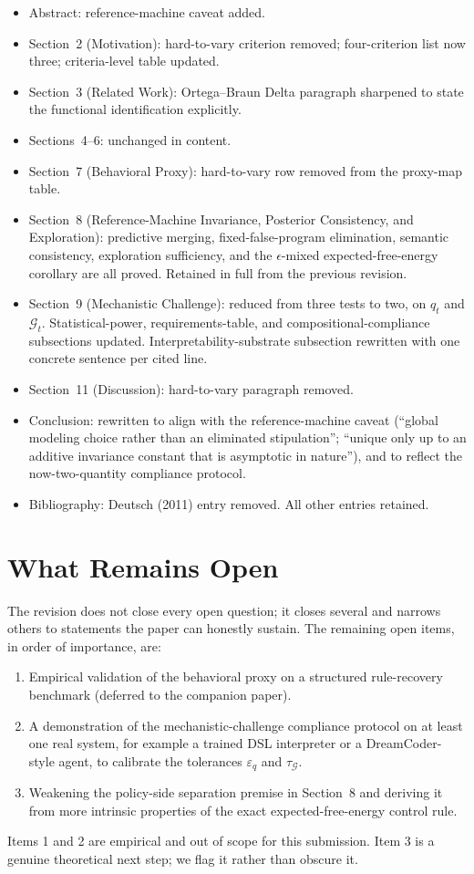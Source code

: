 \documentclass[11pt]{article}
\begin{document}
\begin{itemize}
\item Abstract: reference-machine caveat added.
\item Section~2 (Motivation): hard-to-vary criterion removed; four-criterion list now three; criteria-level table updated.
\item Section~3 (Related Work): Ortega--Braun Delta paragraph sharpened to state the functional identification explicitly.
\item Sections~4--6: unchanged in content.
\item Section~7 (Behavioral Proxy): hard-to-vary row removed from the proxy-map table.
\item Section~8 (Reference-Machine Invariance, Posterior Consistency, and Exploration): predictive merging, fixed-false-program elimination, semantic consistency, exploration sufficiency, and the $\epsilon$-mixed expected-free-energy corollary are all proved. Retained in full from the previous revision.
\item Section~9 (Mechanistic Challenge): reduced from three tests to two, on $q_t$ and $\mathcal{G}_t$. Statistical-power, requirements-table, and compositional-compliance subsections updated. Interpretability-substrate subsection rewritten with one concrete sentence per cited line.
\item Section~11 (Discussion): hard-to-vary paragraph removed.
\item Conclusion: rewritten to align with the reference-machine caveat (``global modeling choice rather than an eliminated stipulation''; ``unique only up to an additive invariance constant that is asymptotic in nature''), and to reflect the now-two-quantity compliance protocol.
\item Bibliography: Deutsch (2011) entry removed. All other entries retained.
\end{itemize}

\section*{What Remains Open}

The revision does not close every open question; it closes several and narrows others to statements the paper can honestly sustain. The remaining open items, in order of importance, are:
\begin{enumerate}
\item Empirical validation of the behavioral proxy on a structured rule-recovery benchmark (deferred to the companion paper).
\item A demonstration of the mechanistic-challenge compliance protocol on at least one real system, for example a trained DSL interpreter or a DreamCoder-style agent, to calibrate the tolerances $\varepsilon_q$ and $\tau_\mathcal{G}$.
\item Weakening the policy-side separation premise in Section~8 and deriving it from more intrinsic properties of the exact expected-free-energy control rule.
\end{enumerate}

Items 1 and 2 are empirical and out of scope for this submission. Item 3 is a genuine theoretical next step; we flag it rather than obscure it.
\end{document}
